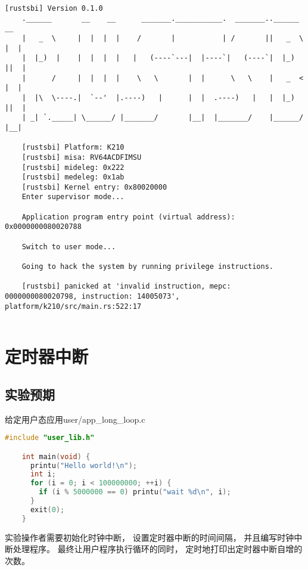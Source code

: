 \begin{lstlisting}[caption={lab2实验结果}, label={lst:app_illegal_instruction_result}]
    [rustsbi] Version 0.1.0
    .______       __    __      _______.___________.  _______..______   __
    |   _  \     |  |  |  |    /       |           | /       ||   _  \ |  |
    |  |_)  |    |  |  |  |   |   (----`---|  |----`|   (----`|  |_)  ||  |
    |      /     |  |  |  |    \   \       |  |      \   \    |   _  < |  |
    |  |\  \----.|  `--'  |.----)   |      |  |  .----)   |   |  |_)  ||  |
    | _| `._____| \______/ |_______/       |__|  |_______/    |______/ |__|
    
    [rustsbi] Platform: K210
    [rustsbi] misa: RV64ACDFIMSU
    [rustsbi] mideleg: 0x222
    [rustsbi] medeleg: 0x1ab
    [rustsbi] Kernel entry: 0x80020000
    Enter supervisor mode...
    
    Application program entry point (virtual address): 0x0000000080020788
    
    Switch to user mode...
    
    Going to hack the system by running privilege instructions.
    
    [rustsbi] panicked at 'invalid instruction, mepc: 0000000080020798, instruction: 14005073', platform/k210/src/main.rs:522:17
        
\end{lstlisting}

\section{定时器中断}

\subsection{实验预期}

给定用户态应用user/app\_long\_loop.c

\begin{lstlisting}[caption={用户态应用app\_long\_loop.c}, label={lst:app_long_loop}, language=C]
    #include "user_lib.h"

    int main(void) {
      printu("Hello world!\n");
      int i;
      for (i = 0; i < 100000000; ++i) {
        if (i % 5000000 == 0) printu("wait %d\n", i);
      }
      exit(0);
    }
\end{lstlisting}

实验操作者需要初始化时钟中断，
设置定时器中断的时间间隔，
并且编写时钟中断处理程序。
最终让用户程序执行循环的同时，
定时地打印出定时器中断自增的次数。


